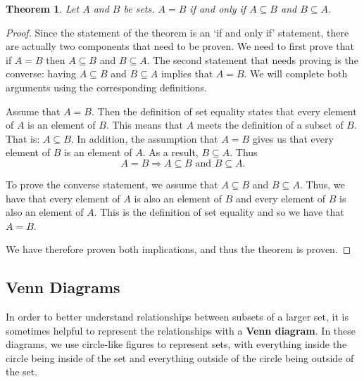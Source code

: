 \documentclass[
]{book}
\newtheorem{theorem}{Theorem}[chapter]
\theoremstyle{definition}
\theoremstyle{definition}
\theoremstyle{definition}
\theoremstyle{definition}
\theoremstyle{remark}
\begin{document}
\begin{theorem}
\protect\hypertarget{thm:set-equality}{}\label{thm:set-equality}Let \(A\) and \(B\) be sets. \(A=B\) if and only if \(A \subseteq B\) and \(B \subseteq A\).
\end{theorem}

\begin{proof}
Since the statement of the theorem is an `if and only if' statement, there are actually two components that need to be proven. We need to first prove that if \(A=B\) then \(A \subseteq B\) and \(B \subseteq A\). The second statement that needs proving is the converse: having \(A \subseteq B\) and \(B \subseteq A\) implies that \(A=B\). We will complete both arguments using the corresponding definitions.

Assume that \(A=B\). Then the definition of set equality states that every element of \(A\) is an element of \(B\). This means that \(A\) meets the definition of a subset of \(B\). That is: \(A\subseteq B\). In addition, the assumption that \(A=B\) gives us that every element of \(B\) is an element of \(A\). As a result, \(B\subseteq A\). Thus \[A=B \Rightarrow A\subseteq B \mbox{ and } B\subseteq A.\]

To prove the converse statement, we assume that \(A \subseteq B\) and \(B \subseteq A\). Thus, we have that every element of \(A\) is also an element of \(B\) and every element of \(B\) is also an element of \(A\). This is the definition of set equality and so we have that \(A=B\).

We have therefore proven both implications, and thus the theorem is proven.
\end{proof}

\hypertarget{venn-diagrams}{%
\subsection{Venn Diagrams}\label{venn-diagrams}}

In order to better understand relationships between subsets of a larger set, it is sometimes helpful to represent the relationships with a \textbf{Venn diagram}. In these diagrams, we use circle-like figures to represent sets, with everything inside the circle being inside of the set and everything outside of the circle being outside of the set.
\end{document}
